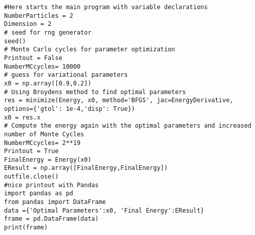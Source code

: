 \documentclass{beamer}
\begin{document}
\begin{frame}
\begin{verbatim}
#Here starts the main program with variable declarations
NumberParticles = 2
Dimension = 2
# seed for rng generator 
seed()
# Monte Carlo cycles for parameter optimization
Printout = False
NumberMCcycles= 10000
# guess for variational parameters
x0 = np.array([0.9,0.2])
# Using Broydens method to find optimal parameters
res = minimize(Energy, x0, method='BFGS', jac=EnergyDerivative, options={'gtol': 1e-4,'disp': True})
x0 = res.x
# Compute the energy again with the optimal parameters and increased number of Monte Cycles
NumberMCcycles= 2**19
Printout = True
FinalEnergy = Energy(x0)
EResult = np.array([FinalEnergy,FinalEnergy])
outfile.close()
#nice printout with Pandas
import pandas as pd
from pandas import DataFrame
data ={'Optimal Parameters':x0, 'Final Energy':EResult}
frame = pd.DataFrame(data)
print(frame)

\end{verbatim}
\end{frame}
\end{document}
